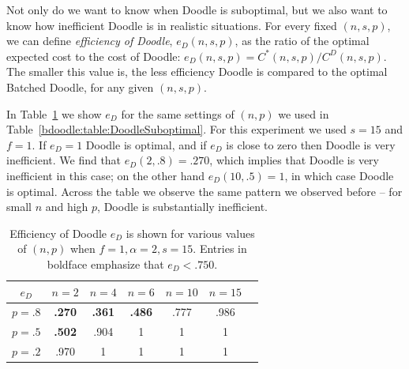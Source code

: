 Not only do we want to know when Doodle is suboptimal, but we also want to know how inefficient Doodle is in realistic situations. For every fixed $(n, s, p)$, we can define {\em efficiency of Doodle}, $e_{D}(n,s,p)$, as the ratio of the optimal expected cost to the cost of Doodle: $e_{D}(n,s,p) = C^*(n, s, p) / C^D(n, s, p)$. The smaller this value is, the less efficiency Doodle is compared to the optimal Batched Doodle, for any given $(n, s, p)$.


In Table~\ref{bdoodle:table:DoodleEfficiency} we show $e_{D}$ for the same settings of $(n, p)$ we used in Table~\ref{bdoodle:table:DoodleSuboptimal}. For this experiment we used $s = 15$ and $f = 1$. If $e_{D} = 1$ Doodle is optimal, and if $e_{D}$ is close to zero then Doodle is very inefficient. We find that $e_{D}(2, .8) = .270$, which implies that Doodle is very inefficient in this case; on the other hand $e_{D}(10, .5) = 1$, in which case Doodle is optimal. Across the table we observe the same pattern we observed before -- for small $n$ and high $p$, Doodle is substantially inefficient.
\begin{table}[h]  
	\small
\centering
\begin{tabular}{|c|c|c|c|c|c|c|}
	\hline
	$e_{D}$ & $n = 2$ & $n = 4$ & $n = 6$ & $ n = 10 $ & $n = 15$ \\ \hline
	$p = .8$ & \textbf{.270} & \textbf{.361} & \textbf{.486} & .777 & .986 \\ \hline
	$p = .5$ & \textbf{.502} & .904 & 1 & 1 & 1  \\ \hline
	$p = .2$ & .970 & 1 & 1 & 1 & 1\\ \hline	
\end{tabular}
\caption{Efficiency of Doodle $e_{D}$ is shown for various values of $(n, p)$ when $f = 1, \alpha=2, s = 15$. Entries in boldface emphasize that $e_{D} < .750$. } \label{bdoodle:table:DoodleEfficiency}
\end{table}

